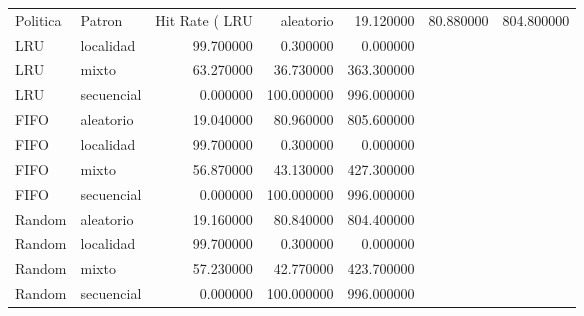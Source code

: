 \begin{tabular}{llrrr}
\toprule
Politica & Patron & Hit Rate (%
\midrule
LRU & aleatorio & 19.120000 & 80.880000 & 804.800000 \\
LRU & localidad & 99.700000 & 0.300000 & 0.000000 \\
LRU & mixto & 63.270000 & 36.730000 & 363.300000 \\
LRU & secuencial & 0.000000 & 100.000000 & 996.000000 \\
FIFO & aleatorio & 19.040000 & 80.960000 & 805.600000 \\
FIFO & localidad & 99.700000 & 0.300000 & 0.000000 \\
FIFO & mixto & 56.870000 & 43.130000 & 427.300000 \\
FIFO & secuencial & 0.000000 & 100.000000 & 996.000000 \\
Random & aleatorio & 19.160000 & 80.840000 & 804.400000 \\
Random & localidad & 99.700000 & 0.300000 & 0.000000 \\
Random & mixto & 57.230000 & 42.770000 & 423.700000 \\
Random & secuencial & 0.000000 & 100.000000 & 996.000000 \\
\bottomrule
\end{tabular}
